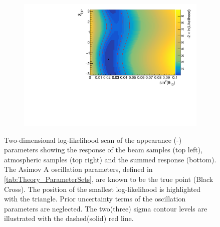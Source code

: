 \begin{figure}[h]
\begin{subfigure}[t]{0.5\textwidth}
  \end{subfigure}
  \begin{subfigure}[t]{1.0\textwidth}
    \includegraphics[width=\textwidth, trim={0mm 0mm 0mm 0mm}, clip,page=3]{Figures/OA/AppearanceScans.pdf}
  \end{subfigure}
  \caption{Two-dimensional log-likelihood scan of the appearance (-) parameters showing the response of the beam samples (top left), atmospheric samples (top right) and the summed response (bottom). The Asimov A oscillation parameters, defined in \autoref{tab:Theory_ParameterSets}, are known to be the true point (Black Cross). The position of the smallest log-likelihood is highlighted with the triangle. Prior uncertainty terms of the oscillation parameters are neglected. The two(three) sigma contour levels are illustrated with the dashed(solid) red line.}
  \label{fig:OscillationAnalysis_2DLLHOscScans_App}
\end{figure}

